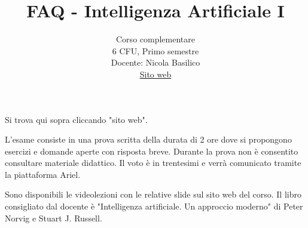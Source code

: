 \documentclass{article}
\title{FAQ - \textbf{Intelligenza Artificiale I}}
\author{
	Corso complementare \\6 CFU, Primo semestre\\
	Docente: Nicola Basilico\\ 
	\href{http://nbasilicoia.ariel.ctu.unimi.it/.}{Sito web}
	\date{}
}
\begin{document}
 

\maketitle
	
\begin{QuestionList}
		
     {
        Si trova qui sopra cliccando "sito web".
	}
		
	 {
		 L'esame consiste in una prova scritta della durata di 2 ore dove si propongono
		 esercizi e domande aperte con risposta breve. Durante la prova non è consentito
		 consultare materiale didattico.
		 Il voto è in trentesimi e verrà comunicato tramite la piattaforma Ariel.
	}
		
	 {
		Sono disponibili le videolezioni con le relative slide sul sito web del corso.
		Il libro consigliato dal docente è "Intelligenza artificiale. Un approccio moderno"
		di Peter Norvig e Stuart J. Russell.
	}
		
	\end{QuestionList}
	
\end{document}
